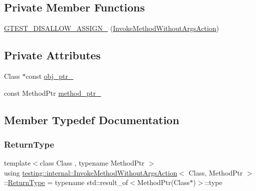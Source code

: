 \subsection*{Private Member Functions}
\begin{DoxyCompactItemize}
\item 
\mbox{\hyperlink{structtesting_1_1internal_1_1_invoke_method_without_args_action_a4a2d094368220a3f68ee0648cd93372a}{G\+T\+E\+S\+T\+\_\+\+D\+I\+S\+A\+L\+L\+O\+W\+\_\+\+A\+S\+S\+I\+G\+N\+\_\+}} (\mbox{\hyperlink{structtesting_1_1internal_1_1_invoke_method_without_args_action}{Invoke\+Method\+Without\+Args\+Action}})
\end{DoxyCompactItemize}
\subsection*{Private Attributes}
\begin{DoxyCompactItemize}
\item 
Class $\ast$const \mbox{\hyperlink{structtesting_1_1internal_1_1_invoke_method_without_args_action_a43f6bbf17c63e7638e04ac5db327d6bb}{obj\+\_\+ptr\+\_\+}}
\item 
const Method\+Ptr \mbox{\hyperlink{structtesting_1_1internal_1_1_invoke_method_without_args_action_a3630808193580bba30b3a828ada58eca}{method\+\_\+ptr\+\_\+}}
\end{DoxyCompactItemize}


\subsection{Member Typedef Documentation}
\mbox{\label{structtesting_1_1internal_1_1_invoke_method_without_args_action_ad1acb81830c5636daf7c6d44064b4e58}} 
\subsubsection{\texorpdfstring{ReturnType}{ReturnType}\hspace{0.1cm}{\footnotesize\ttfamily [1/2]}}
{\footnotesize\ttfamily template$<$class Class , typename Method\+Ptr $>$ \\
using \mbox{\hyperlink{structtesting_1_1internal_1_1_invoke_method_without_args_action}{testing\+::internal\+::\+Invoke\+Method\+Without\+Args\+Action}}$<$ Class, Method\+Ptr $>$\+::\mbox{\hyperlink{structtesting_1_1internal_1_1_invoke_method_without_args_action_ad1acb81830c5636daf7c6d44064b4e58}{Return\+Type}} =  typename std\+::result\+\_\+of$<$Method\+Ptr(Class$\ast$)$>$\+::type}

